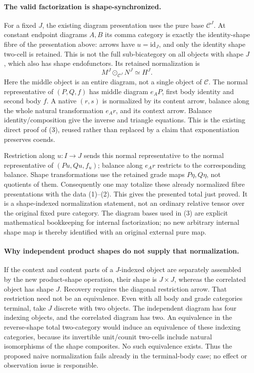 \documentclass{article}
\begin{document}
\paragraph{The valid factorization is shape-synchronized.} For a fixed $J$, the existing diagram presentation uses the pure base $\mathcal C^J$. At constant endpoint diagrams $A,B$ its comma category is exactly the identity-shape fibre of the presentation above: arrows have $u=\mathrm{id}_J$, and only the identity shape two-cell is retained. This is not the full sub-bicategory on all objects with shape $J$, which also has shape endofunctors. Its retained normalization is
\[
 M^J\odot_{\mathcal C^J}N^J\simeq H^J.
\tag{3}
\]
Here the middle object is an entire diagram, not a single object of $\mathcal C$. The normal representative of $(P,Q,f)$ has middle diagram $e_AP$, first body identity and second body $f$. A native $(r,s)$ is normalized by its content arrow, balance along the whole natural transformation $e_A r$, and its context arrow. Balance identity/composition give the inverse and triangle equations. This is the existing direct proof of (3), reused rather than replaced by a claim that exponentiation preserves coends.

Restriction along $u:I\to J$ sends this normal representative to the normal representative of $(Pu,Qu,f_u)$; balance along $e_A r$ restricts to the corresponding balance. Shape transformations use the retained grade maps $P\eta,Q\eta$, not quotients of them. Consequently one may totalize these already normalized fibre presentations with the data (1)--(2). This gives the presented total just proved. It is a shape-indexed normalization statement, not an ordinary relative tensor over the original fixed pure category. The diagram bases used in (3) are explicit mathematical bookkeeping for internal factorization; no new arbitrary internal shape map is thereby identified with an original external pure map.

\paragraph{Why independent product shapes do not supply that normalization.} If the context and content parts of a $J$-indexed object are separately assembled by the new product-shape operation, their shape is $J\times J$, whereas the correlated object has shape $J$. Recovery requires the diagonal restriction arrow. That restriction need not be an equivalence. Even with all body and grade categories terminal, take $J$ discrete with two objects. The independent diagram has four indexing objects, and the correlated diagram has two. An equivalence in the reverse-shape total two-category would induce an equivalence of these indexing categories, because its invertible unit/counit two-cells include natural isomorphisms of the shape composites. No such equivalence exists. Thus the proposed naive normalization fails already in the terminal-body case; no effect or observation issue is responsible.
\end{document}
